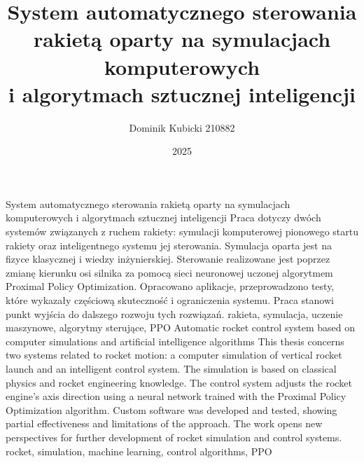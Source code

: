 \documentclass{SGGW-thesis/SGGW-thesis}
\title{System automatycznego sterowania rakietą oparty na symulacjach komputerowych\\i algorytmach sztucznej inteligencji}
\author{Dominik Kubicki 210882}
\date{2025}
\begin{document}
\maketitle
\statementpage


\abstractpage
{System automatycznego sterowania rakietą oparty na symulacjach komputerowych i algorytmach sztucznej inteligencji}
{Praca dotyczy dwóch systemów związanych z ruchem rakiety: symulacji komputerowej pionowego startu rakiety oraz inteligentnego systemu jej sterowania. Symulacja oparta jest na fizyce klasycznej i wiedzy inżynierskiej. Sterowanie realizowane jest poprzez zmianę kierunku osi silnika za pomocą sieci neuronowej uczonej algorytmem Proximal Policy Optimization. Opracowano aplikacje, przeprowadzono testy, które wykazały częściową skuteczność i ograniczenia systemu. Praca stanowi punkt wyjścia do dalszego rozwoju tych rozwiązań.}
{rakieta, symulacja, uczenie maszynowe, algorytmy sterujące, PPO}
{Automatic rocket control system based on computer simulations and artificial intelligence algorithms}
{This thesis concerns two systems related to rocket motion: a computer simulation of vertical rocket launch and an intelligent control system. The simulation is based on classical physics and rocket engineering knowledge. The control system adjusts the rocket engine's axis direction using a neural network trained with the Proximal Policy Optimization algorithm. Custom software was developed and tested, showing partial effectiveness and limitations of the approach. The work opens new perspectives for further development of rocket simulation and control systems.}
{rocket, simulation, machine learning, control algorithms, PPO}
\end{document}
